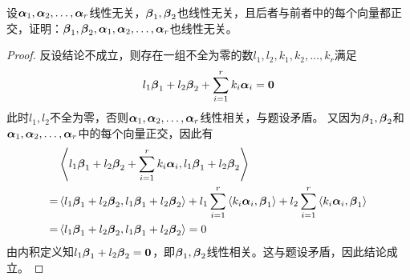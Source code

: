 \begin{problem}
设\(\enums{\vecal}{r}\)线性无关，\(\vecbeta_1,\vecbeta_2\)也线性无关，且后者与前者中的每个向量都正交，证明：\(\vecbeta_1,\vecbeta_2,\enums{\vecal}{r}\)也线性无关。
\end{problem}
\begin{proof}
    反设结论不成立，则存在一组不全为零的数\(l_1,l_2,k_1,k_2,\dots,k_r\)满足
    \begin{equation*}
        l_1\vecbeta_1+l_2\vecbeta_2+\sum_{i=1}^rk_i\vecal_i=\veczero
    \end{equation*}
    此时\(l_1,l_2\)不全为零，否则\(\enums{\vecal}{r}\)线性相关，与题设矛盾。
    又因为\(\vecbeta_1,\vecbeta_2\)和\(\enums{\vecal}{r}\)中的每个向量正交，因此有
    \begin{align*}
          & \indot{l_1\vecbeta_1+l_2\vecbeta_2+\sum_{i=1}^rk_i\vecal_i}{l_1\vecbeta_1+l_2\vecbeta_2}   \\
        = & \indot{l_1\vecbeta_1+l_2\vecbeta_2}{l_1\vecbeta_1+l_2\vecbeta_2}
        +l_1\sum_{i=1}^r\indot{k_i\vecal_i}{\vecbeta_1}+l_2\sum_{i=1}^r\indot{k_i\vecal_i}{\vecbeta_1} \\
        = & \indot{l_1\vecbeta_1+l_2\vecbeta_2}{l_1\vecbeta_1+l_2\vecbeta_2}=0
    \end{align*}
    由内积定义知\(l_1\vecbeta_1+l_2\vecbeta_2=\veczero\)，即\(\vecbeta_1,\vecbeta_2\)线性相关。这与题设矛盾，因此结论成立。
\end{proof}

